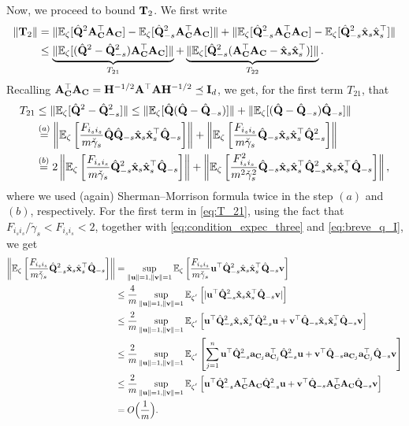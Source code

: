 \documentclass[11pt,a4paper]{article}
\begin{document}
Now, we proceed to bound $\mathbf{T}_2$. We first write
\begin{align}
    \|\mathbf{T}_2\|
    &= \|{\mathbb{E}}_{\zeta}[\hat{\mathbf{Q}}^2\mathbf{A}_{\mathbf{C}}^\top\mathbf{A}_{\mathbf{C}}]-{\mathbb{E}}_{\zeta}[\hat{\mathbf{Q}}^2_{-s}\mathbf{A}_{\mathbf{C}}^\top\mathbf{A}_{\mathbf{C}}]\|+\|{\mathbb{E}}_{\zeta}[\hat{\mathbf{Q}}^2_{-s}\mathbf{A}_{\mathbf{C}}^\top\mathbf{A}_{\mathbf{C}}]-
{\mathbb{E}}_{\zeta}[\hat{\mathbf{Q}}^2_{-s}\hat{\mathbf{x}}_s\hat{\mathbf{x}}_s^\top]\| \nonumber\\
    &\leq\underbrace{\|{\mathbb{E}}_{\zeta}[(\hat{\mathbf{Q}}^2-\hat{\mathbf{Q}}^2_{-s})\mathbf{A}_{\mathbf{C}}^\top\mathbf{A}_{\mathbf{C}}]\|}_{T_{21}}+\underbrace{\|
{\mathbb{E}}_{\zeta}[\hat{\mathbf{Q}}^2_{-s}(\mathbf{A}_{\mathbf{C}}^\top\mathbf{A}_{\mathbf{C}}-\hat{\mathbf{x}}_s\hat{\mathbf{x}}_s^\top)]\|}_{T_{22}} \nonumber.
\end{align}
Recalling $\mathbf{A}_{\mathbf{C}}^\top\mathbf{A}_{\mathbf{C}}=\mathbf{H}^{-1/2}\mathbf{A}^{\top}\mathbf{A}\mathbf{H}^{-1/2} \preceq \mathbf{I}_d$, we get,  for  the first term $T_{21}$, that
\begin{align} \label{eq:T_21}
T_{21}&\leq  \|{\mathbb{E}}_{\zeta}[\hat{\mathbf{Q}}^2-\hat{\mathbf{Q}}^2_{-s}]\| \leq \|{\mathbb{E}}_{\zeta}[\hat{\mathbf{Q}}(\hat{\mathbf{Q}}-\hat{\mathbf{Q}}_{-s})]\|+\|{\mathbb{E}}_{\zeta}[(\hat{\mathbf{Q}}-\hat{\mathbf{Q}}_{-s})\hat{\mathbf{Q}}_{-s}]\|\nonumber\\
& \overset{(a)}{=}\left \| {\mathbb{E}}_{\zeta}\left[\frac{F_{i_si_s}}{m\check \gamma_s}\hat{\mathbf{Q}}\hat{\mathbf{Q}}_{-s}\hat{\mathbf{x}}_s\hat{\mathbf{x}}_s^\top\hat{\mathbf{Q}}_{-s}\right]\right\| + \left\|{\mathbb{E}}_{\zeta}\left[\frac{F_{i_si_s}}{m\check \gamma_s}\hat{\mathbf{Q}}_{-s}\hat{\mathbf{x}}_s\hat{\mathbf{x}}_s^\top\hat{\mathbf{Q}}^2_{-s}\right]\right\|\nonumber\\
& \overset{(b)}{=} 2\left\|{\mathbb{E}}_{\zeta}\left[\frac{F_{i_si_s}}{m\check \gamma_s}\hat{\mathbf{Q}}^2_{-s}\hat{\mathbf{x}}_s\hat{\mathbf{x}}_s^\top\hat{\mathbf{Q}}_{-s}\right]\right\|+\left \|{\mathbb{E}}_{\zeta}\left[\frac{F^2_{i_si_s}}{m^2\check \gamma^2_s}\hat{\mathbf{Q}}_{-s}\hat{\mathbf{x}}_s\hat{\mathbf{x}}_s^\top\hat{\mathbf{Q}}^2_{-s}\hat{\mathbf{x}}_s\hat{\mathbf{x}}_s^\top\hat{\mathbf{Q}}_{-s}\right]\right\|,
\end{align}
where we used (again) Sherman--Morrison formula twice in the step $(a)$ and $(b)$, respectively.
For the first term in \eqref{eq:T_21}, using the fact that $F_{i_si_s}/\check \gamma_s<F_{i_si_s}<2$, together with \eqref{eq:condition_expec_three} and \eqref{eq:breve_q_I}, we get
 \begin{align}
 \left\|{\mathbb{E}}_{\zeta}\left[\frac{F_{i_si_s}}{m\check \gamma_s}\hat{\mathbf{Q}}^2_{-s}\hat{\mathbf{x}}_s\hat{\mathbf{x}}_s^\top\hat{\mathbf{Q}}_{-s}\right]\right\| &=\sup\limits_{\|\mathbf{u}\|=1,\|\mathbf{v}\|=1} {\mathbb{E}}_{\zeta}\left[\frac{F_{i_si_s}}{m\check \gamma_s}\mathbf{u}^\top\hat{\mathbf{Q}}^2_{-s}\hat{\mathbf{x}}_s\hat{\mathbf{x}}_s^\top\hat{\mathbf{Q}}_{-s}\mathbf{v}\right]  \nonumber \\ 
 &\leq \frac{4}{m} \sup\limits_{\|\mathbf{u}\|=1,\|\mathbf{v}\|=1} {\mathbb{E}}_{\zeta^{'}}\left[|\mathbf{u}^\top\hat{\mathbf{Q}}^2_{-s}\hat{\mathbf{x}}_s\hat{\mathbf{x}}_s^\top\hat{\mathbf{Q}}_{-s}\mathbf{v}|\right] \nonumber\\
 &\leq \frac{2}{m} \sup\limits_{\|\mathbf{u}\|=1,\|\mathbf{v}\|=1} {\mathbb{E}}_{\zeta^{'}}\left[\mathbf{u}^\top\hat{\mathbf{Q}}^2_{-s}\hat{\mathbf{x}}_s\hat{\mathbf{x}}_s^\top\hat{\mathbf{Q}}^2_{-s}\mathbf{u}+\mathbf{v}^\top\hat{\mathbf{Q}}_{-s}\hat{\mathbf{x}}_s
 \hat{\mathbf{x}}_s^\top\hat{\mathbf{Q}}_{-s}\mathbf{v}\right] \nonumber\\
  &\leq \frac{2}{m}\sup\limits_{\|\mathbf{u}\|=1,\|\mathbf{v}\|=1} {\mathbb{E}}_{\zeta^{'}}\left[\sum^n_{j=1}\mathbf{u}^\top\hat{\mathbf{Q}}^2_{-s}\mathbf{a}_{\mathbf{C}_j}\mathbf{a}_{\mathbf{C}_j}^\top\hat{\mathbf{Q}}^2_{-s}\mathbf{u}+\mathbf{v}^\top\hat{\mathbf{Q}}_{-s}\mathbf{a}_{\mathbf{C}_j}
\mathbf{a}_{\mathbf{C}_j}^\top\hat{\mathbf{Q}}_{-s}\mathbf{v}\right] \nonumber\\
  &\leq \frac{2}{m}\sup\limits_{\|\mathbf{u}\|=1,\|\mathbf{v}\|=1} {\mathbb{E}}_{\zeta^{'}}\left[\mathbf{u}^\top\hat{\mathbf{Q}}^2_{-s}\mathbf{A}_{\mathbf{C}}^\top\mathbf{A}_{\mathbf{C}}\hat{\mathbf{Q}}^2_{-s}\mathbf{u}+\mathbf{v}^\top\hat{\mathbf{Q}}_{-s}\mathbf{A}_{\mathbf{C}}^\top\mathbf{A}_{\mathbf{C}}\hat{\mathbf{Q}}_{-s}\mathbf{v}\right] \nonumber \\ 
  &= O\Big(\frac{1}{m}\Big).\nonumber
 \end{align}
\end{document}
